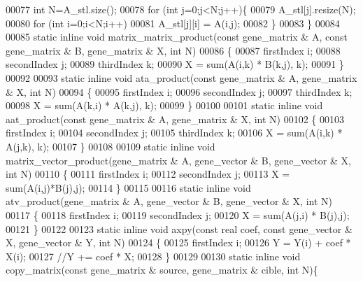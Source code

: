 \begin{DoxyCode}
00077     \textcolor{keywordtype}{int} N=A\_stl.size();
00078     \textcolor{keywordflow}{for} (\textcolor{keywordtype}{int} j=0;j<N;j++)\{
00079       A\_stl[j].resize(N);
00080       \textcolor{keywordflow}{for} (\textcolor{keywordtype}{int} i=0;i<N;i++)
00081         A\_stl[j][i] = A(i,j);
00082     \}
00083   \}
00084 
00085   \textcolor{keyword}{static} \textcolor{keyword}{inline} \textcolor{keywordtype}{void} matrix\_matrix\_product(\textcolor{keyword}{const} gene\_matrix & A, \textcolor{keyword}{const} gene\_matrix & B, gene\_matrix & X, \textcolor{keywordtype}{
      int} N)
00086   \{
00087     firstIndex i;
00088     secondIndex j;
00089     thirdIndex k;
00090     X = sum(A(i,k) * B(k,j), k);
00091   \}
00092 
00093   \textcolor{keyword}{static} \textcolor{keyword}{inline} \textcolor{keywordtype}{void} ata\_product(\textcolor{keyword}{const} gene\_matrix & A, gene\_matrix & X, \textcolor{keywordtype}{int} N)
00094   \{
00095     firstIndex i;
00096     secondIndex j;
00097     thirdIndex k;
00098     X = sum(A(k,i) * A(k,j), k);
00099   \}
00100 
00101   \textcolor{keyword}{static} \textcolor{keyword}{inline} \textcolor{keywordtype}{void} aat\_product(\textcolor{keyword}{const} gene\_matrix & A, gene\_matrix & X, \textcolor{keywordtype}{int} N)
00102   \{
00103     firstIndex i;
00104     secondIndex j;
00105     thirdIndex k;
00106     X = sum(A(i,k) * A(j,k), k);
00107   \}
00108 
00109   \textcolor{keyword}{static} \textcolor{keyword}{inline} \textcolor{keywordtype}{void} matrix\_vector\_product(gene\_matrix & A, gene\_vector & B, gene\_vector & X, \textcolor{keywordtype}{int} N)
00110   \{
00111     firstIndex i;
00112     secondIndex j;
00113     X = sum(A(i,j)*B(j),j);
00114   \}
00115 
00116   \textcolor{keyword}{static} \textcolor{keyword}{inline} \textcolor{keywordtype}{void} atv\_product(gene\_matrix & A, gene\_vector & B, gene\_vector & X, \textcolor{keywordtype}{int} N)
00117   \{
00118     firstIndex i;
00119     secondIndex j;
00120     X = sum(A(j,i) * B(j),j);
00121   \}
00122 
00123   \textcolor{keyword}{static} \textcolor{keyword}{inline} \textcolor{keywordtype}{void} axpy(\textcolor{keyword}{const} real coef, \textcolor{keyword}{const} gene\_vector & X, gene\_vector & Y, \textcolor{keywordtype}{int} N)
00124   \{
00125     firstIndex i;
00126     Y = Y(i) + coef * X(i);
00127     \textcolor{comment}{//Y += coef * X;}
00128   \}
00129 
00130   \textcolor{keyword}{static} \textcolor{keyword}{inline} \textcolor{keywordtype}{void} copy\_matrix(\textcolor{keyword}{const} gene\_matrix & source, gene\_matrix & cible, \textcolor{keywordtype}{int} N)\{

\end{DoxyCode}

